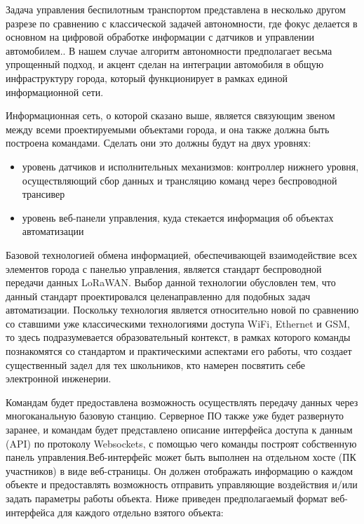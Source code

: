 Задача управления беспилотным транспортом представлена в несколько другом разрезе по сравнению с классической задачей автономности, где фокус делается в основном на цифровой обработке информации с датчиков и управлении автомобилем.. В нашем случае алгоритм автономности предполагает весьма упрощенный подход, и акцент сделан на интеграции автомобиля в общую инфраструктуру города, который функционирует в рамках единой информационной сети.

Информационная сеть, о которой сказано выше, является связующим звеном между всеми проектируемыми объектами города, и она также должна быть построена командами. Сделать они это должны будут на двух уровнях:
\begin{itemize}
    \item уровень датчиков и исполнительных механизмов: контроллер нижнего уровня, осуществляющий сбор данных и трансляцию команд через беспроводной трансивер
    \item уровень веб-панели управления, куда стекается информация об объектах автоматизации        
\end{itemize}

Базовой технологией обмена информацией, обеспечивающей взаимодействие всех элементов города с панелью управления, является стандарт беспроводной передачи данных LoRaWAN. Выбор данной технологии обусловлен тем, что данный стандарт проектировался целенаправленно для подобных задач автоматизации. Поскольку технология является относительно новой по сравнению со ставшими уже классическими технологиями доступа WiFi, Ethernet и GSM, то здесь подразумевается образовательный контекст, в рамках которого команды познакомятся со стандартом и практическими аспектами его работы, что создает существенный задел для тех школьников, кто намерен посвятить себе электронной инженерии. 

Командам будет предоставлена возможность осуществлять передачу данных через многоканальную базовую станцию. Серверное ПО также уже будет развернуто заранее, и командам будет представлено описание интерфейса доступа к данным (API) по протоколу Websockets, с помощью чего команды построят собственную панель управления.Веб-интерфейс может быть выполнен на отдельном хосте (ПК участников) в виде веб-страницы. Он должен отображать информацию о каждом объекте и предоставлять возможность отправить управляющие воздействия и/или задать параметры работы объекта. Ниже приведен предполагаемый формат веб-интерфейса для каждого отдельно взятого объекта:

